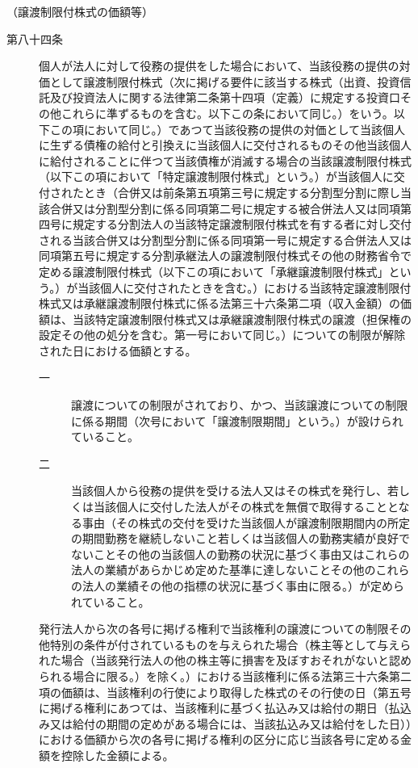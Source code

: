 \documentclass[twocolumn,a4j,10pt]{ltjtarticle}
\begin{document}
\noindent\hspace{10pt}（譲渡制限付株式の価額等）
\begin{description}
\item[第八十四条]個人が法人に対して役務の提供をした場合において、当該役務の提供の対価として譲渡制限付株式（次に掲げる要件に該当する株式（出資、投資信託及び投資法人に関する法律第二条第十四項（定義）に規定する投資口その他これらに準ずるものを含む。以下この条において同じ。）をいう。以下この項において同じ。）であつて当該役務の提供の対価として当該個人に生ずる債権の給付と引換えに当該個人に交付されるものその他当該個人に給付されることに伴つて当該債権が消滅する場合の当該譲渡制限付株式（以下この項において「特定譲渡制限付株式」という。）が当該個人に交付されたとき（合併又は前条第五項第三号に規定する分割型分割に際し当該合併又は分割型分割に係る同項第二号に規定する被合併法人又は同項第四号に規定する分割法人の当該特定譲渡制限付株式を有する者に対し交付される当該合併又は分割型分割に係る同項第一号に規定する合併法人又は同項第五号に規定する分割承継法人の譲渡制限付株式その他の財務省令で定める譲渡制限付株式（以下この項において「承継譲渡制限付株式」という。）が当該個人に交付されたときを含む。）における当該特定譲渡制限付株式又は承継譲渡制限付株式に係る法第三十六条第二項（収入金額）の価額は、当該特定譲渡制限付株式又は承継譲渡制限付株式の譲渡（担保権の設定その他の処分を含む。第一号において同じ。）についての制限が解除された日における価額とする。
\begin{description}
\item[一]譲渡についての制限がされており、かつ、当該譲渡についての制限に係る期間（次号において「譲渡制限期間」という。）が設けられていること。
\item[二]当該個人から役務の提供を受ける法人又はその株式を発行し、若しくは当該個人に交付した法人がその株式を無償で取得することとなる事由（その株式の交付を受けた当該個人が譲渡制限期間内の所定の期間勤務を継続しないこと若しくは当該個人の勤務実績が良好でないことその他の当該個人の勤務の状況に基づく事由又はこれらの法人の業績があらかじめ定めた基準に達しないことその他のこれらの法人の業績その他の指標の状況に基づく事由に限る。）が定められていること。
\end{description}
\item[]発行法人から次の各号に掲げる権利で当該権利の譲渡についての制限その他特別の条件が付されているものを与えられた場合（株主等として与えられた場合（当該発行法人の他の株主等に損害を及ぼすおそれがないと認められる場合に限る。）を除く。）における当該権利に係る法第三十六条第二項の価額は、当該権利の行使により取得した株式のその行使の日（第五号に掲げる権利にあつては、当該権利に基づく払込み又は給付の期日（払込み又は給付の期間の定めがある場合には、当該払込み又は給付をした日））における価額から次の各号に掲げる権利の区分に応じ当該各号に定める金額を控除した金額による。

\end{description}
\end{document}
